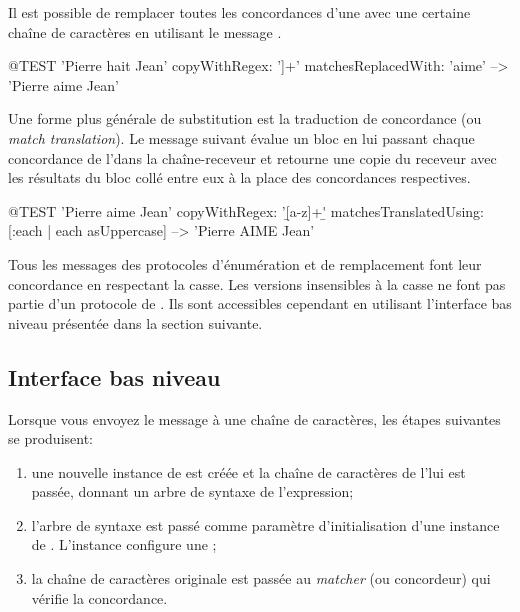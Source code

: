 \documentclass[a4paper,10pt,twoside]{book}
\begin{document}
Il est possible de remplacer toutes les concordances d'une \expreg
avec une certaine chaîne de caractères en utilisant le message  .

\begin{code}{@TEST}
'Pierre hait Jean' copyWithRegex: '\<[[:lower:]]+\>' matchesReplacedWith: 'aime' -->  'Pierre aime Jean'
\end{code}

Une forme plus générale de substitution est la traduction de
concordance (ou \emph{match translation}). Le message suivant évalue
un bloc en lui passant chaque concordance de l'\expreg dans la
chaîne-receveur et retourne une copie du receveur avec les résultats
du bloc collé entre eux à la place des concordances respectives.

\begin{code}{@TEST}
'Pierre aime Jean' copyWithRegex: '\b[a-z]+\b' matchesTranslatedUsing:
[:each | each asUppercase] --> 'Pierre AIME Jean'
\end{code}

Tous les messages des protocoles d'énumération et de remplacement font
leur concordance en respectant la casse. Les versions insensibles à la
casse ne font pas partie d'un protocole de .
Ils sont accessibles cependant en utilisant l'interface bas niveau
présentée dans la section suivante.
\subsection{Interface bas niveau}

Lorsque vous envoyez le message  à une
chaîne de caractères, les étapes suivantes se produisent:

\begin{enumerate}
\item une nouvelle instance de  est créée et la
  chaîne de caractères de l'\expreg lui est passée, donnant un arbre
  de syntaxe de l'expression;
\item  l'arbre de syntaxe est passé comme paramètre d'initialisation
  d'une instance de . L'instance configure une
  ;
\item la chaîne de caractères originale est passée au \emph{matcher}
  (ou concordeur)
  qui vérifie la concordance.
\end{enumerate}
\end{document}
